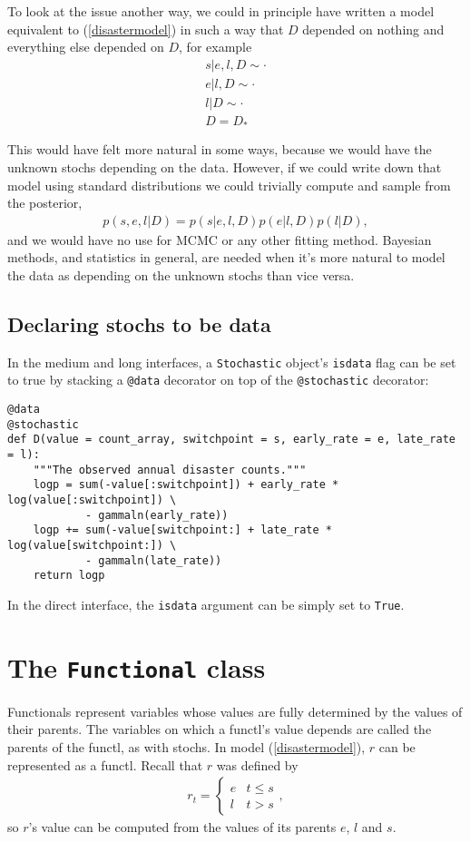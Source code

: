 \medskip
To look at the issue another way, we could in principle have written a model equivalent to (\ref{disastermodel}) in such a way that $D$ depended on nothing and everything else depended on $D$, for example
\begin{eqnarray*}
    s|e,l,D\sim\cdot\\
    e|l,D\sim\cdot\\
    l|D\sim\cdot\\
    D=D_*
\end{eqnarray*}

This would have felt more natural in some ways, because we would have the unknown stochs depending on the data. However, if we could write down that model using standard distributions we could trivially compute and sample from the posterior,
\begin{eqnarray*}
    p(s,e,l|D) = p(s|e, l, D) p(e|l, D) p(l|D),
\end{eqnarray*}
and we would have no use for MCMC or any other fitting method. Bayesian methods, and statistics in general, are needed when it's more natural to model the data as depending on the unknown stochs than vice versa.

\subsection{Declaring stochs to be data}

In the medium and long interfaces, a \texttt{Stochastic} object's \texttt{isdata} flag can be set to true by stacking a \texttt{@data} decorator on top of the \texttt{@stochastic} decorator:
\begin{verbatim}
@data
@stochastic
def D(value = count_array, switchpoint = s, early_rate = e, late_rate = l):
    """The observed annual disaster counts."""
    logp = sum(-value[:switchpoint]) + early_rate * log(value[:switchpoint]) \
            - gammaln(early_rate))
    logp += sum(-value[switchpoint:] + late_rate * log(value[switchpoint:]) \
            - gammaln(late_rate))
    return logp
\end{verbatim}
In the direct interface, the \texttt{isdata} argument can be simply set to \texttt{True}.


\section{The \texttt{Functional} class}\label{functl}

Functionals represent variables whose values are fully determined by the values of their parents. The variables on which a functl's value depends are called the parents of the functl, as with stochs. In model (\ref{disastermodel}), $r$ can be represented as a functl. Recall that $r$ was defined by
\begin{eqnarray*}
    r_t=\left\{\begin{array}{ll}
        e & t\le s\\ l & t>s
        \end{array}\right.,
\end{eqnarray*}
so $r$'s value can be computed from the values of its parents $e$, $l$ and $s$.

